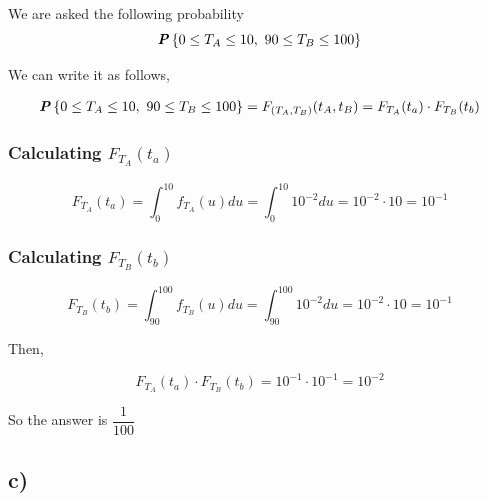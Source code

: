 We are asked the following probability
\begin{equation*}
  \textbf{\textit{P}}\left\{0 \leq T_A \leq 10,\ 90 \leq T_B \leq 100\right\}
\end{equation*}

We can write it as follows,

\begin{align*}
  \textbf{\textit{P}}\left\{0 \leq T_A \leq 10,\ 90 \leq T_B \leq 100\right\} = F_{(T_A, T_B)} (t_A, t_B) = F_{T_A} (t_a) \cdot F_{T_B} (t_b)
\end{align*}

\subsubsection*{Calculating $F_{T_A} (t_a)$}

\begin{equation*}
  F_{T_A} (t_a) = \int_{0}^{10} f_{T_A} (u) du = \int_{0}^{10} 10^{-2} du = 10^{-2} \cdot 10 = 10^{-1}
\end{equation*}

\subsubsection*{Calculating $F_{T_B} (t_b)$}

\begin{equation*}
  F_{T_B} (t_b) = \int_{90}^{100} f_{T_B} (u) du = \int_{90}^{100} 10^{-2} du = 10^{-2} \cdot 10 = 10^{-1}
\end{equation*}

Then,

\begin{equation*}
  F_{T_A} (t_a) \cdot F_{T_B} (t_b) = 10^{-1} \cdot 10^{-1} = 10^{-2}
\end{equation*}

So the answer is $\dfrac{1}{100}$

\subsection*{c)}




